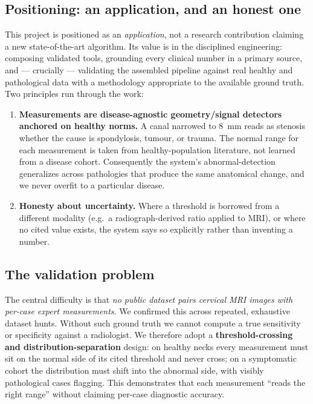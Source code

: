 \subsection{Positioning: an application, and an honest one}
This project is positioned as an \emph{application}, not a research contribution claiming a new
state-of-the-art algorithm. Its value is in the disciplined engineering: composing validated tools,
grounding every clinical number in a primary source, and --- crucially --- validating the assembled
pipeline against real healthy and pathological data with a methodology appropriate to the available
ground truth. Two principles run through the work:
\begin{enumerate}[leftmargin=*]
  \item \textbf{Measurements are disease-agnostic geometry/signal detectors anchored on healthy norms.}
  A canal narrowed to \SI{8}{\milli\meter} reads as stenosis whether the cause is spondylosis, tumour,
  or trauma. The normal range for each measurement is taken from healthy-population literature, not
  learned from a disease cohort. Consequently the system's abnormal-detection generalizes across
  pathologies that produce the same anatomical change, and we never overfit to a particular disease.
  \item \textbf{Honesty about uncertainty.} Where a threshold is borrowed from a different modality
  (e.g.\ a radiograph-derived ratio applied to MRI), or where no cited value exists, the system says so
  explicitly rather than inventing a number.
\end{enumerate}

\subsection{The validation problem}
The central difficulty is that \emph{no public dataset pairs cervical MRI images with per-case expert
measurements}. We confirmed this across repeated, exhaustive dataset hunts. Without such ground truth we
cannot compute a true sensitivity or specificity against a radiologist. We therefore adopt a
\textbf{threshold-crossing and distribution-separation} design: on healthy necks every measurement must
sit on the normal side of its cited threshold and never cross; on a symptomatic cohort the distribution
must shift into the abnormal side, with visibly pathological cases flagging. This demonstrates that each
measurement ``reads the right range'' without claiming per-case diagnostic accuracy.

